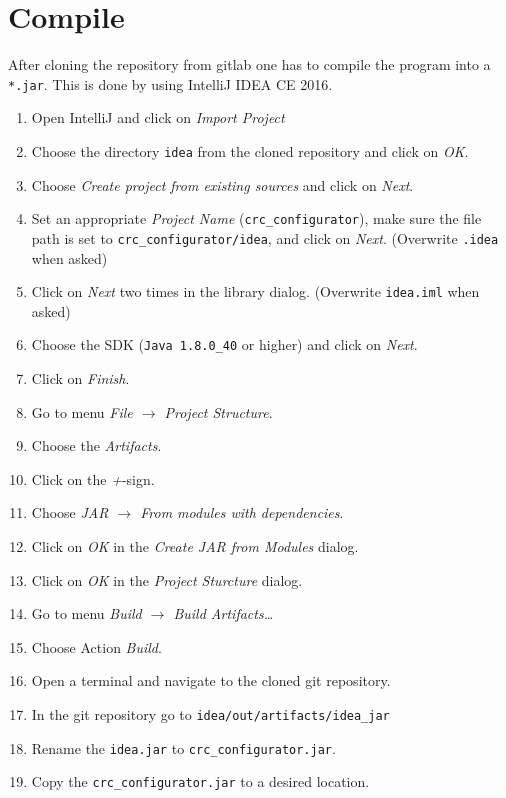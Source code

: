 \documentclass{article}
\begin{document}
\section*{Compile}
After cloning the repository from gitlab one has to compile the program into a \texttt{*.jar}. This is done by using IntelliJ IDEA CE 2016. 
\begin{enumerate}
    \item Open IntelliJ and click on \textit{Import Project}
    \item Choose the directory \texttt{idea} from the cloned repository and click on \textit{OK}.
    \item Choose \textit{Create project from existing sources} and click on \textit{Next}.
    \item Set an appropriate \textit{Project Name} (\texttt{crc\_configurator}), make sure the file path is set to \texttt{crc\_configurator/idea}, and click on \textit{Next}. (Overwrite \texttt{.idea} when asked)
    \item Click on \textit{Next} two times in the library dialog. (Overwrite \texttt{idea.iml} when asked)
    \item Choose the SDK (\texttt{Java 1.8.0\_40} or higher) and click on \textit{Next}.
    \item Click on \textit{Finish}.
    \item Go to menu \textit{File $\rightarrow$ Project Structure}.
    \item Choose the \textit{Artifacts}.
    \item Click on the \textit{+}-sign.
    \item Choose \textit{JAR $\rightarrow$ From modules with dependencies}.
    \item Click on \textit{OK} in the \textit{Create JAR from Modules} dialog.
    \item Click on \textit{OK} in the \textit{Project Sturcture} dialog.
    \item Go to menu \textit{Build $\rightarrow$ Build Artifacts\dots}
    \item Choose Action \textit{Build}.
    \item Open a terminal and navigate to the cloned git repository.
    \item In the git repository go to \texttt{idea/out/artifacts/idea\_jar}
    \item Rename the \texttt{idea.jar} to \texttt{crc\_configurator.jar}.
    \item Copy the \texttt{crc\_configurator.jar} to a desired location.
\end{enumerate}
\end{document}
